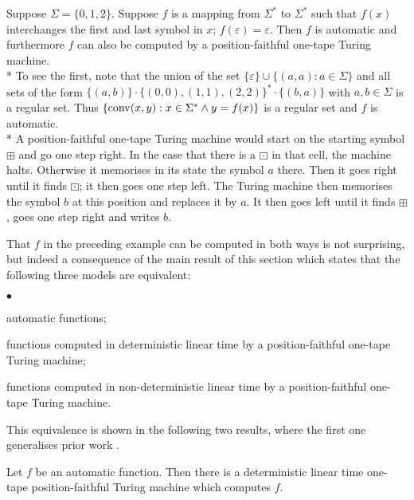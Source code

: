 \documentclass{LMCS}
\theoremstyle{plain}\newtheorem{athm}[thm]{Theorem}
\theoremstyle{plain}\newtheorem{aprop}[thm]{Proposition}
\theoremstyle{plain}\newtheorem{aprob}[thm]{Open Problem}
\theoremstyle{plain}\newtheorem{acor}[thm]{Corollary}
\theoremstyle{plain}\newtheorem{alem}[thm]{Lemma}
\theoremstyle{definition}\newtheorem{adefn}[thm]{Definition}
\theoremstyle{definition}\newtheorem{arem}[thm]{Remark}
\theoremstyle{plain}\newtheorem{aexmp}[thm]{Example}
\theoremstyle{plain}\newtheorem{aclm}[thm]{Claim}
\def\conv{{\rm{conv}}}
\def\sp{\\*\indent}
\begin{document}
\begin{exa} \label{ex:firstlastexchange}
Suppose $\Sigma = \{0,1,2\}$. Suppose $f$ is a mapping from $\Sigma^*$ to
$\Sigma^*$ such that $f(x)$ interchanges the first and last symbol in $x$;
$f(\varepsilon) = \varepsilon$.
Then $f$ is automatic and furthermore $f$ can also be computed by a
position-faithful one-tape Turing machine.
\sp
To see the first, note that the union of the set
$\{\varepsilon\} \cup \{(a,a): a \in \Sigma\}$ and
all sets of the form $\{(a,b)\} \cdot \{(0,0),(1,1),(2,2)\}^* \cdot
\{(b,a)\}$ with $a,b \in \Sigma$ is a regular set.
Thus $\{\conv(x,y): x \in \Sigma^* \wedge y = f(x)\}$
is a regular set and $f$ is automatic.
\sp
A position-faithful one-tape Turing machine would start on the
starting symbol $\boxplus$ and go one step right. In the case
that there is a $\boxdot$ in that cell,
the machine halts. Otherwise it memorises in
its state the symbol $a$ there. Then it goes right until it finds
$\boxdot$; it then goes one step left. 
The Turing machine then memorises the symbol $b$ at this position
and replaces it by $a$. It then goes left until it finds $\boxplus$,
goes one step right and writes $b$.
\end{exa}

\noindent
That $f$ in the preceding example can be computed in both ways
is not surprising, but indeed a consequence of the main result
of this section which states that the following three
models are equivalent:
\begin{iteMize}{$\bullet$}
\item automatic functions;
\item functions computed in deterministic linear time by a position-faithful
      one-tape Turing machine;
\item functions computed in non-deterministic linear time by a
      position-faithful one-tape Turing machine.
\end{iteMize}
This equivalence is shown in the following two results, where the first
one generalises prior work \cite[Remark 2]{CJLOSS11}.

\begin{thm} \label{th:islinear}
Let $f$ be an automatic function. Then there is a deterministic linear time
one-tape position-faithful Turing machine which computes $f$.
\end{thm}
\end{document}
